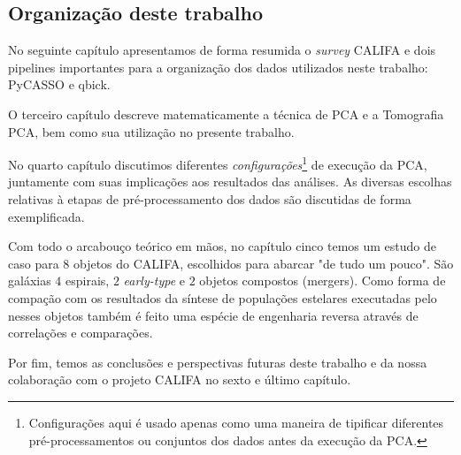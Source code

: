 \subsection{Organização deste trabalho}

No seguinte capítulo apresentamos de forma resumida o {\em survey} CALIFA e dois pipelines importantes para a
organização dos dados utilizados neste trabalho: PyCASSO e {\sc qbick}.

O terceiro capítulo descreve matematicamente a técnica de PCA e a Tomografia PCA, bem como sua utilização no presente trabalho. 

No quarto capítulo discutimos diferentes {\em configurações}\footnote{Configurações aqui é usado apenas como uma maneira
de tipificar diferentes pré-processamentos ou conjuntos dos dados antes da execução da PCA.} de execução da PCA,
juntamente com suas implicações aos resultados das análises. As diversas escolhas relativas à etapas de
pré-processamento dos dados são discutidas de forma exemplificada.

Com todo o arcabouço teórico em mãos, no capítulo cinco temos um estudo de caso para $8$ objetos do CALIFA, escolhidos
para abarcar "de tudo um pouco". São galáxias $4$ espirais, $2$ {\em early-type} e $2$ objetos compostos (mergers). Como
forma de compação com os resultados da síntese de populações estelares executadas pelo \starlight nesses objetos também
é feito uma espécie de engenharia reversa através de correlações e comparações.

Por fim, temos as conclusões e perspectivas futuras deste trabalho e da nossa colaboração com o projeto CALIFA no sexto
e último capítulo. 

